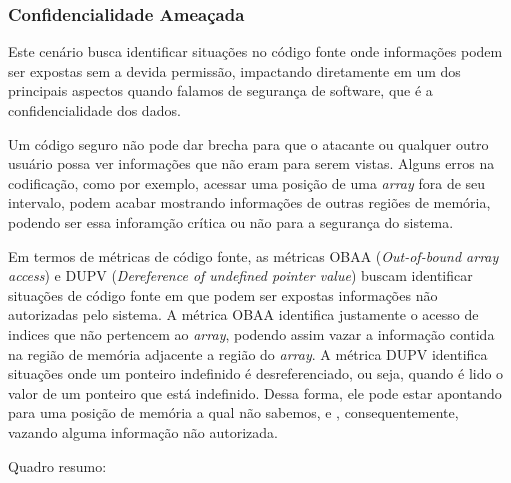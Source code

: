 \subsubsection{Confidencialidade Ameaçada}

Este cenário busca identificar situações no código fonte onde informações podem ser expostas sem a devida permissão, impactando diretamente em um dos principais aspectos quando falamos de segurança de software, que é a confidencialidade dos dados.

Um código seguro não pode dar brecha para que o atacante ou qualquer outro usuário possa ver informações que não eram para serem vistas. Alguns erros na codificação, como por exemplo, acessar uma posição de uma \emph{array} fora de seu intervalo, podem acabar mostrando informações de outras regiões de memória, podendo ser essa inforamção crítica ou não para a segurança do sistema.

Em termos de métricas de código fonte, as métricas OBAA (\emph{Out-of-bound array access}) e DUPV (\emph{Dereference of undefined pointer value}) buscam identificar situações de código fonte em que podem ser expostas informações não autorizadas pelo sistema. A métrica OBAA identifica justamente o acesso de indices que não pertencem ao \emph{array}, podendo assim vazar a informação contida na região de memória adjacente a região do \emph{array}. A métrica DUPV identifica situações onde um ponteiro indefinido é desreferenciado, ou seja, quando é lido o valor de um ponteiro que está indefinido. Dessa forma, ele pode estar apontando para uma posição de memória a qual não sabemos, e , consequentemente, vazando alguma informação não autorizada. 

Quadro resumo:

